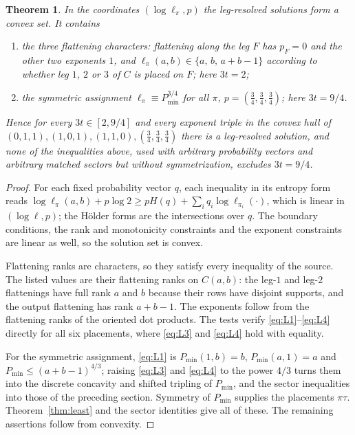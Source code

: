 \documentclass[11pt]{article}
\newtheorem{theorem}{Theorem}
\begin{document}
\begin{theorem}\label{thm:leg}
In the coordinates $(\log\ell_\pi,p)$ the leg-resolved solutions form a
convex set. It contains
\begin{enumerate}
\item the three flattening characters: flattening along the leg $F$
has $p_F=0$ and the other two exponents $1$, and
$\ell_\pi(a,b)\in\{a,\,b,\,a+b-1\}$ according to whether leg $1$, $2$
or $3$ of $C$ is placed on $F$; here $3t=2$;
\item the symmetric assignment $\ell_\pi\equiv P_{\min}^{3/4}$ for all
$\pi$, $p=(\tfrac34,\tfrac34,\tfrac34)$; here $3t=9/4$.
\end{enumerate}
Hence for every $3t\in[2,9/4]$ and every exponent triple in the convex
hull of $(0,1,1),(1,0,1),(1,1,0),(\tfrac34,\tfrac34,\tfrac34)$ there is
a leg-resolved solution, and none of the inequalities above, used with
arbitrary probability vectors and arbitrary matched sectors but without
symmetrization, excludes $3t=9/4$.
\end{theorem}
\begin{proof}
For each fixed probability vector $q$, each inequality in its entropy
form reads
$\log\ell_\pi(a,b)+p\log2\ge pH(q)+\sum_iq_i\log\ell_{\pi_i}(\cdot)$,
which is linear in $(\log\ell,p)$; the H\"older forms are the
intersections over $q$. The boundary conditions, the rank and
monotonicity constraints and the exponent constraints are linear as
well, so the solution set is convex.

Flattening ranks are characters, so they satisfy every inequality of
the source. The listed values are their flattening ranks on
$C(a,b)$: the leg-$1$ and leg-$2$ flattenings have full rank $a$ and $b$
because their rows have disjoint supports, and the output flattening
has rank $a+b-1$. The exponents follow from the flattening ranks of the
oriented dot products. The tests verify \eqref{eq:L1}--\eqref{eq:L4}
directly for all six placements, where \eqref{eq:L3} and \eqref{eq:L4}
hold with equality.

For the symmetric assignment, \eqref{eq:L1} is $P_{\min}(1,b)=b$,
$P_{\min}(a,1)=a$ and $P_{\min}\le(a+b-1)^{4/3}$; raising
\eqref{eq:L3} and \eqref{eq:L4} to the power $4/3$ turns them into the
discrete concavity and shifted tripling of $P_{\min}$, and the sector
inequalities into those of the preceding section. Symmetry of $P_{\min}$
supplies the placements $\pi\tau$. Theorem~\ref{thm:least} and the
sector identities give all of these. The remaining assertions follow
from convexity.
\end{proof}
\end{document}
